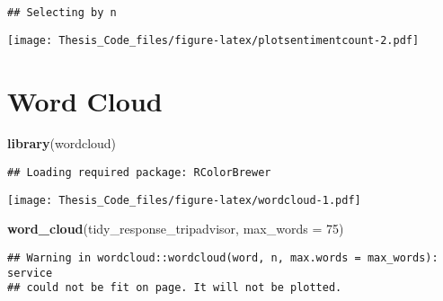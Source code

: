 \documentclass[]{article}
\newenvironment{Shaded}{\begin{snugshade}}{\end{snugshade}}
\newcommand{\KeywordTok}[1]{\textcolor[rgb]{0.13,0.29,0.53}{\textbf{#1}}}
\newcommand{\DataTypeTok}[1]{\textcolor[rgb]{0.13,0.29,0.53}{#1}}
\newcommand{\DecValTok}[1]{\textcolor[rgb]{0.00,0.00,0.81}{#1}}
\newcommand{\StringTok}[1]{\textcolor[rgb]{0.31,0.60,0.02}{#1}}
\newcommand{\ControlFlowTok}[1]{\textcolor[rgb]{0.13,0.29,0.53}{\textbf{#1}}}
\newcommand{\OperatorTok}[1]{\textcolor[rgb]{0.81,0.36,0.00}{\textbf{#1}}}
\newcommand{\NormalTok}[1]{#1}
\begin{document}
\begin{verbatim}
## Selecting by n
\end{verbatim}

\texttt{[image: Thesis\_Code\_files/figure-latex/plotsentimentcount-2.pdf]}

\section{Word Cloud}\label{word-cloud}

\begin{Shaded}
\begin{Highlighting}[]
\KeywordTok{library}\NormalTok{(wordcloud)}
\end{Highlighting}
\end{Shaded}

\begin{verbatim}
## Loading required package: RColorBrewer
\end{verbatim}

\begin{Shaded}
\end{Shaded}

\texttt{[image: Thesis\_Code\_files/figure-latex/wordcloud-1.pdf]}

\begin{Shaded}
\begin{Highlighting}[]
\KeywordTok{word_cloud}\NormalTok{(tidy_response_tripadvisor, }\DataTypeTok{max_words =} \DecValTok{75}\NormalTok{)}
\end{Highlighting}
\end{Shaded}

\begin{verbatim}
## Warning in wordcloud::wordcloud(word, n, max.words = max_words): service
## could not be fit on page. It will not be plotted.
\end{verbatim}
\end{document}
